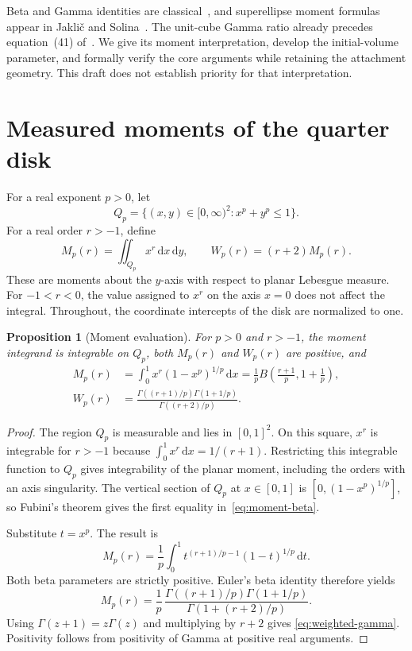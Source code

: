 \documentclass[11pt]{article}
\numberwithin{equation}{section}
\newtheorem{proposition}[theorem]{Proposition}
\theoremstyle{remark}
\newcommand{\dd}{\,\mathrm{d}}
\begin{document}
Beta and Gamma identities are classical~\cite{DLMF}, and superellipse
moment formulas appear in Jakli\v{c} and Solina~\cite{JaklicSolina2003}.
The unit-cube Gamma ratio already precedes equation~(41)
of~\cite{FitzhughFarnsworth2013}. We give its moment interpretation,
develop the initial-volume parameter, and formally verify the core
arguments while retaining the attachment geometry. This draft does
not establish priority for that interpretation.

\section{Measured moments of the quarter disk}
\label{sec:moments}

For a real exponent $p>0$, let
\begin{equation}
  Q_p=\{(x,y)\in[0,\infty)^2:x^p+y^p\leq 1\}.
  \label{eq:quarter-disk}
\end{equation}
For a real order $r>-1$, define
\begin{equation}
  M_p(r)=\iint_{Q_p}x^r\dd x\dd y,
  \qquad
  W_p(r)=(r+2)M_p(r).
  \label{eq:moments}
\end{equation}
These are moments about the $y$-axis with respect to planar Lebesgue
measure. For $-1<r<0$, the value assigned to $x^r$ on the axis $x=0$
does not affect the integral. Throughout, the coordinate intercepts
of the disk are normalized to one.

\begin{proposition}[Moment evaluation]
\label{prop:moment}
For $p>0$ and $r>-1$, the moment integrand is integrable on $Q_p$,
both $M_p(r)$ and $W_p(r)$ are positive, and
\begin{align}
  M_p(r)
    &=\int_0^1 x^r(1-x^p)^{1/p}\dd x
      =\frac1p B\!\left(\frac{r+1}{p},1+\frac1p\right),
       \label{eq:moment-beta}\\
  W_p(r)
    &=\frac{\Gamma((r+1)/p)\Gamma(1+1/p)}
            {\Gamma((r+2)/p)}.
       \label{eq:weighted-gamma}
\end{align}
\end{proposition}

\begin{proof}
The region $Q_p$ is measurable and lies in $[0,1]^2$.
On this square, $x^r$ is integrable for $r>-1$ because
$\int_0^1 x^r\dd x=1/(r+1)$.
Restricting this integrable function to $Q_p$ gives integrability
of the planar moment, including the orders with an axis singularity.
The vertical section of $Q_p$ at $x\in[0,1]$ is
$[0,(1-x^p)^{1/p}]$, so Fubini's theorem gives the first equality
in~\eqref{eq:moment-beta}.

Substitute $t=x^p$. The result is
\[
  M_p(r)=\frac1p\int_0^1
       t^{(r+1)/p-1}(1-t)^{1/p}\dd t.
\]
Both beta parameters are strictly positive. Euler's beta identity
therefore yields
\[
  M_p(r)=\frac1p\,
    \frac{\Gamma((r+1)/p)\Gamma(1+1/p)}
         {\Gamma(1+(r+2)/p)}.
\]
Using $\Gamma(z+1)=z\Gamma(z)$ and multiplying by $r+2$ gives
\eqref{eq:weighted-gamma}. Positivity follows from positivity of
Gamma at positive real arguments.
\end{proof}
\end{document}
